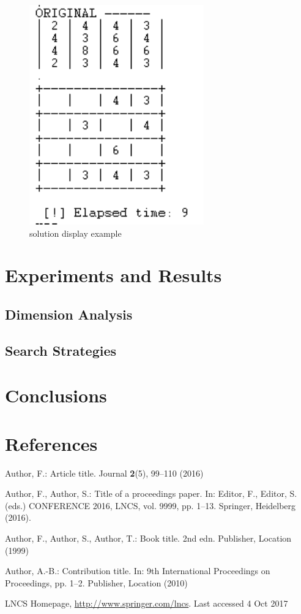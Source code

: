 \documentclass[runningheads]{llncs}
\begin{document}
\begin{figure}
\includegraphics[scale=1]{solutionDisplay}
\centering
\caption{solution display example}
\centering
\end{figure}


\section{Experiments and Results}
\subsection{Dimension Analysis}
\subsection{Search Strategies}

\section{Conclusions}

\section{References}

%
%
% 
% 
%
\begin{thebibliography}{8}
Author, F.: Article title. Journal \textbf{2}(5), 99--110 (2016)

Author, F., Author, S.: Title of a proceedings paper. In: Editor,
F., Editor, S. (eds.) CONFERENCE 2016, LNCS, vol. 9999, pp. 1--13.
Springer, Heidelberg (2016). 

Author, F., Author, S., Author, T.: Book title. 2nd edn. Publisher,
Location (1999)

Author, A.-B.: Contribution title. In: 9th International Proceedings
on Proceedings, pp. 1--2. Publisher, Location (2010)

LNCS Homepage, \url{http://www.springer.com/lncs}. Last accessed 4
Oct 2017
\end{thebibliography}
\end{document}
